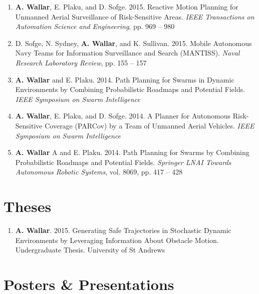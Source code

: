 \documentclass[line,margin]{cv}
\begin{document}
\begin{resume}
\begin{enumerate}
    \item \textbf{A. Wallar}, E. Plaku, and D. Sofge. 2015.
        Reactive Motion Planning for Unmanned Aerial Surveillance
        of Risk-Sensitive Areas. \textit{IEEE Transactions on Automation Science
    and Engineering}, pp. 969 -- 980

    \item D. Sofge, N. Sydney, \textbf{A. Wallar}, and K. Sullivan. 2015.
        Mobile Autonomous Navy Teams for Information Surveillance
        and Search (MANTISS). \textit{Naval Research Laboratory Review}, pp. 155 -- 157

    \item \textbf{A. Wallar} and E. Plaku. 2014. Path Planning for
        Swarms in Dynamic Environments by Combining Probabilistic Roadmaps
        and Potential Fields. \textit{IEEE Symposium on Swarm Intelligence}

    \item \textbf{A. Wallar}, E. Plaku, and D. Sofge. 2014. A Planner
        for Autonomous Risk-Sensitive Coverage (PARCov) by a Team of Unmanned
        Aerial Vehicles. \textit{IEEE Symposium on Swarm Intelligence}

    \item \textbf{A. Wallar} A and E. Plaku. 2014. Path Planning for
        Swarms by Combining Probabilistic Roadmaps and Potential Fields.
        \textit{Springer LNAI Towards Autonomous Robotic Systems}, vol. 8069,
        pp. 417 -- 428

\end{enumerate}

\section{Theses}

\begin{enumerate}

    \item \textbf{A. Wallar}. 2015. Generating Safe Trajectories
        in Stochastic Dynamic Environments by Leveraging Information About
        Obstacle Motion. Undergraduate Thesis. University of St Andrews

\end{enumerate}


\section{Posters \& Presentations}


\end{resume}
\end{document}
